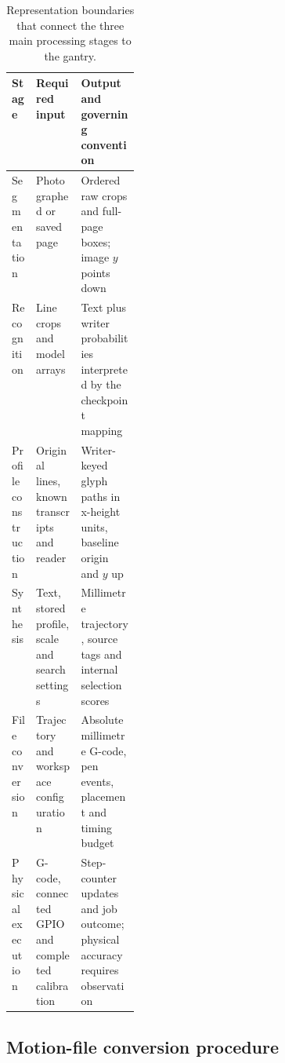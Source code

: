 \begin{table}[!htbp]\centering\small
\begin{tabularx}{\linewidth}{|p{0.19\linewidth}|X|X|}
\hline\textbf{Stage}&\textbf{Required input}&\textbf{Output and governing convention}\\\hline
Segmentation&Photographed or saved page&Ordered raw crops and full-page boxes; image $y$ points down\\\hline
Recognition&Line crops and model arrays&Text plus writer probabilities interpreted by the checkpoint mapping\\\hline
Profile construction&Original lines, known transcripts and reader&Writer-keyed glyph paths in x-height units, baseline origin and $y$ up\\\hline
Synthesis&Text, stored profile, scale and search settings&Millimetre trajectory, source tags and internal selection scores\\\hline
File conversion&Trajectory and workspace configuration&Absolute millimetre G-code, pen events, placement and timing budget\\\hline
Physical execution&G-code, connected GPIO and completed calibration&Step-counter updates and job outcome; physical accuracy requires observation\\\hline
\end{tabularx}
\caption{Representation boundaries that connect the three main processing stages to the gantry.}
\label{tab:des-contracts}
\end{table}

\FloatBarrier
\subsection{Motion-file conversion procedure}\label{app:des-machine-procedure}

